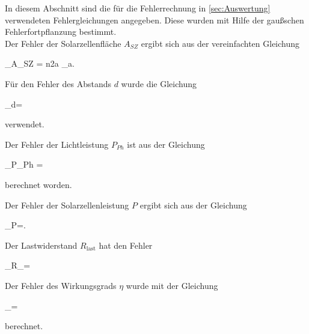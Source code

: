 In diesem Abschnitt sind die für die Fehlerrechnung in \cref{sec:Auswertung} verwendeten Fehlergleichungen angegeben.
Diese wurden mit Hilfe der gaußschen Fehlerfortpflanzung bestimmt.\\

Der Fehler der Solarzellenfläche $A_{SZ}$ ergibt sich aus der vereinfachten Gleichung
\begin{errorEquation}
	\label{std:Fläche}
	\sigma_{A_{SZ}} = n\cdot 2a \cdot \sigma_{a}.
\end{errorEquation}  

Für den Fehler des Abstands $d$ wurde die Gleichung
\begin{errorEquation}
	\label{std:Abstand}
	\sigma_{d}=
\end{errorEquation}
verwendet.

Der Fehler der Lichtleistung $P_{Ph}$ ist aus der Gleichung  
\begin{errorEquation}
	\label{std:Lichtleistung}
	\sigma_{P_{Ph}} = 
\end{errorEquation}
berechnet worden.

Der Fehler der Solarzellenleistung $P$ ergibt sich aus der Gleichung
\begin{errorEquation}
	\label{std:Solarzellenleistung}
	\sigma_{P}=.
\end{errorEquation}

Der Lastwiderstand $R_{\text{last}}$ hat den Fehler
\begin{errorEquation}
	\label{std:Lastwiderstand}
	\sigma_{R_{}}=
\end{errorEquation}

Der Fehler des Wirkungsgrads $\eta$ wurde mit der Gleichung
\begin{errorEquation}
	\label{std:Wirkungsgrad}
	\sigma_{\eta}=
\end{errorEquation}
berechnet.
